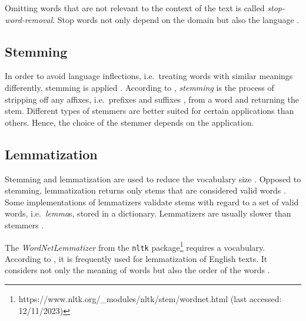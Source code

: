 Omitting words that are not relevant to the context of the text is called \textit{stop-word-removal}.
Stop words not only depend on the domain but also the language \cite{IR2011}.


\subsection{Stemming}\label{subsec:stemming}

In order to avoid language inflections, i.e.\ treating words with similar meanings differently, stemming is applied \cite{clusteringDocs2020}.
According to \citeauthor{nlp-book2009}, \textit{stemming} is the process of stripping off any affixes, i.e.\ prefixes and suffixes \cite{IR2011}, 
from a word and returning the stem.
Different types of stemmers are better suited for certain applications than others.
Hence, the choice of the stemmer depends on the application.



\subsection{Lemmatization}\label{subsec:lemmatization}

Stemming and lemmatization are used to reduce the vocabulary size \cite{clusteringDocs2020}.
Opposed to stemming, lemmatization returns only stems that are considered valid words \cite{nlp-book2009}.
Some implementations of lemmatizers validate stems with regard to a set of valid words, i.e.\ \textit{lemma}s, stored in a dictionary.
Lemmatizers are usually slower than stemmers \cite{nlp-book2009}.

The \textit{WordNetLemmatizer} from the \texttt{nltk} package\footnote{https://www.nltk.org/\_modules/nltk/stem/wordnet.html (last accessed: 12/11/2023)} requires a vocabulary. %
According to \citeauthor{clusteringDocs2020}, it is frequently used for lemmatization of English texts.
It considers not only the meaning of words but also the order of the words \cite{clusteringDocs2020}.



